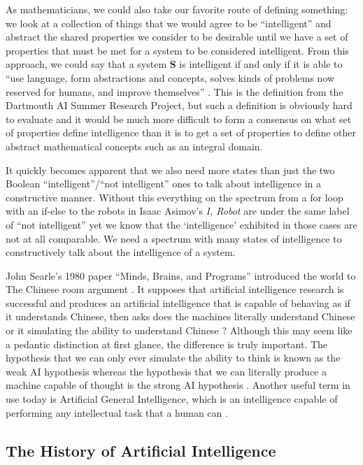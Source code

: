 \documentclass[fleqn,minimal]{article}
\begin{document}
	As mathematicians, we could also take our favorite route of defining something: we look at a collection of things that we would agree to be ``intelligent'' and abstract the shared properties we consider to be desirable until we have a set of properties that must be met for a system to be considered intelligent. From this approach, we could say that a system \textbf{S} is intelligent if and only if it is able to ``use language, form abstractions and concepts, solves kinds of problems now reserved for humans, and improve themselves'' \cite{Jones}. This is the definition from the Dartmouth AI Summer Research Project, but such a definition is obviously hard to evaluate and it would be much more difficult to form a consensus on what set of properties define intelligence than it is to get a set of properties to define other abstract mathematical concepts such as an integral domain.
	
	It quickly becomes apparent that we also need more states than just the two Boolean ``intelligent''/``not intelligent'' ones to talk about intelligence in a constructive manner. Without this everything on the spectrum from a for loop with an if-else to the robots in Isaac Asimov's \textit{I, Robot}  are under the same label of ``not intelligent'' yet we know that the `intelligence' exhibited in those cases are not at all comparable. We need a spectrum with many states of intelligence to constructively talk about the intelligence of a system.
	
	John Searle's 1980 paper ``Minds, Brains, and Programs'' introduced the world to The Chinese room argument \cite{Searle}. It supposes that artificial intelligence research is successful and produces an artificial intelligence that is capable of behaving as if it understands Chinese, then asks does the machines literally understand Chinese or it simulating the ability to understand Chinese \cite{Searle}? Although this may seem like a pedantic distinction at first glance, the difference is truly important. The hypothesis that we can only ever simulate the ability to think is known as the weak AI hypothesis whereas the hypothesis that we can literally produce a machine capable of thought is the strong AI hypothesis \cite{Jones}. Another useful term in use today is Artificial General Intelligence, which is an intelligence capable of performing any intellectual task that a human can \cite{Buchanan}.
	
	\subsection{The History of Artificial Intelligence}
	
\end{document}
